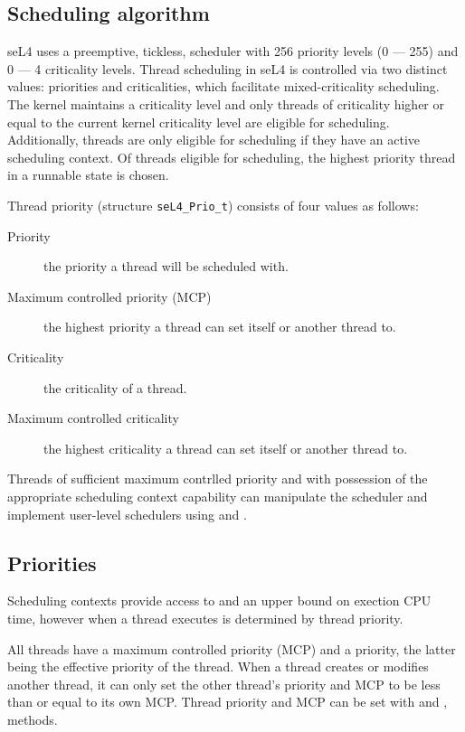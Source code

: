 \subsection{Scheduling algorithm}
\label{sec:sched}

seL4 uses a preemptive, tickless, scheduler with 256 priority levels (0 --- 255) and 0 --- 4 criticality levels.
Thread scheduling in seL4 is controlled via two distinct values: priorities and criticalities, which facilitate mixed-criticality scheduling.
The kernel maintains a criticality level and only threads of criticality higher or equal to the current kernel criticality level are eligible for scheduling.
Additionally, threads are only eligible for scheduling if they have an active scheduling context.
Of threads eligible for scheduling, the highest priority thread in a runnable state is chosen.

Thread priority (structure \texttt{seL4\_Prio\_t}) consists of four values as follows:

\begin{description}
    \item[Priority] the priority a thread will be scheduled with.
    \item[Maximum controlled priority (MCP)] the highest priority a thread can set itself or another thread to.
    \item[Criticality] the criticality of a thread.
    \item[Maximum controlled criticality] the highest criticality a thread can set itself or another thread to. 
\end{description}

Threads of sufficient maximum contrlled priority and with possession of the appropriate scheduling context capability can manipulate the scheduler and implement user-level schedulers using  and .

\subsection{Priorities}

Scheduling contexts provide access to and an upper bound on exection CPU time, however when a thread executes is determined by thread priority.

All threads have a maximum controlled priority (MCP) and a priority, the latter being the effective priority of the thread.
When a thread creates or modifies another thread, it can only set the
other thread's priority and MCP to be less than or equal to its own MCP. Thread priority and MCP can be
set with  and
,  methods.

